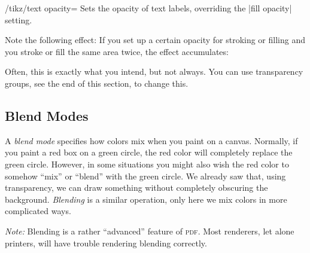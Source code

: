 \begin{key}{/tikz/text opacity=}
  Sets the opacity of text labels, overriding the |fill opacity| setting.
\begin{codeexample}[]
\end{codeexample}
\end{key}


Note the following effect: If you set up a certain opacity for stroking
or filling and you stroke or fill the same area twice, the effect
accumulates:

\begin{codeexample}[]
\end{codeexample}

Often, this is exactly what you intend, but not always. You can use
transparency groups, see the end of this section, to change this.



\subsection{Blend Modes}
\label{section-blend-modes}

A \emph{blend mode} specifies how colors mix when you paint on a
canvas. Normally, if you paint a red box on a green circle, the red
color will completely replace the green circle. However, in some
situations you might also wish the red color to somehow ``mix'' or
``blend'' with the green circle. We already saw that, using transparency,
we can draw something without completely obscuring the
background. \emph{Blending} is a similar operation, only here we mix
colors in more complicated ways.

\emph{Note:} Blending is a rather ``advanced'' feature of
\textsc{pdf}. Most renderers, let alone printers, will have trouble
rendering blending correctly.

